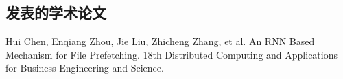 \begin{resume}
  \section*{发表的学术论文} %

  \begin{enumerate}[label={[\arabic*]},itemsep=0pt,parsep=0pt,labelindent=26pt,labelwidth=*,leftmargin=0pt,itemindent=*,align=left]
   
  \item Hui Chen, Enqiang Zhou, Jie Liu, Zhicheng Zhang, et al. An RNN Based Mechanism for File Prefetching. 18th Distributed Computing and Applications for Business Engineering and Science.

  \end{enumerate}
\end{resume}